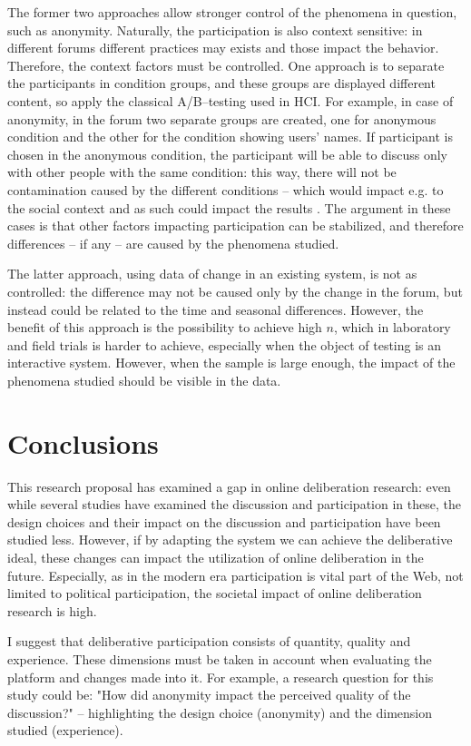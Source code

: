 \documentclass{article}
\begin{document}
The former two approaches allow stronger control of the phenomena in question, such as anonymity. Naturally, the participation is also context sensitive: in different forums different practices may exists and those impact the behavior. Therefore, the context factors must be controlled. One approach is to separate the participants in condition groups, and these groups are displayed different content, so apply the classical A/B--testing used in HCI. For example, in case of anonymity, in the forum two separate groups are created, one for anonymous condition and the other for the condition showing users' names. If participant is chosen in the anonymous condition, the participant will be able to discuss only with other people with the same condition: this way, there will not be contamination caused by the different conditions -- which would impact e.g. to the social context and as such could impact the results \cite{sukumaran11}. The argument in these cases is that other factors impacting participation can be stabilized, and therefore differences -- if any -- are caused by the phenomena studied.

The latter approach, using data of change in an existing system, is not as controlled: the difference may not be caused only by the change in the forum, but instead could be related to the time and seasonal differences. However, the benefit of this approach is the possibility to achieve high $n$, which in laboratory and field trials is harder to achieve, especially when the object of testing is an interactive system. However, when the sample is large enough, the impact of the phenomena studied should be visible in the data.

\section{Conclusions}

This research proposal has examined a gap in online deliberation research: even while several studies have examined the discussion and participation in these, the design choices and their impact on the discussion and participation have been studied less. However, if by adapting the system we can achieve the deliberative ideal, these changes can impact the utilization of online deliberation in the future. Especially, as in the modern era participation is vital part of the Web, not limited to political participation, the societal impact of online deliberation research is high.

I suggest that deliberative participation consists of quantity, quality and experience. These dimensions must be taken in account when evaluating the platform and changes made into it. For example, a research question for this study could be: "How did anonymity impact the perceived quality of the discussion?" -- highlighting the design choice (anonymity) and the dimension studied (experience).
\end{document}
